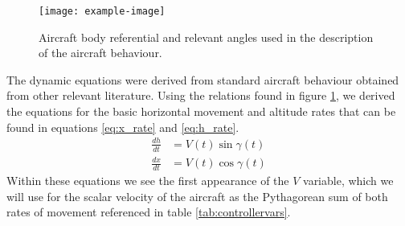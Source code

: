 \documentclass[english,palatino]{ist-report}
\begin{document}
\begin{figure}
	\centering
	\texttt{[image: example-image]}
	\caption{Aircraft body referential and relevant angles used in the description of the aircraft behaviour.}
	\label{fig:bodyref}
\end{figure}

The dynamic equations were derived from standard aircraft behaviour obtained from other relevant literature. Using the relations found in figure \ref{fig:bodyref}, we derived the equations for the basic horizontal movement and altitude rates that can be found in equations \ref{eq:x_rate} and \ref{eq:h_rate}.
\begin{align}\label{eq:x_rate}
	\frac{dh}{dt} &= V(t)\sin{\gamma(t)} \\
	\label{eq:h_rate}
	\frac{dx}{dt} &= V(t)\cos{\gamma(t)}
\end{align}
Within these equations we see the first appearance of the $V$ variable, which we will use for the scalar velocity of the aircraft as the Pythagorean sum of both rates of movement referenced in table \ref{tab:controllervars}.
\end{document}
